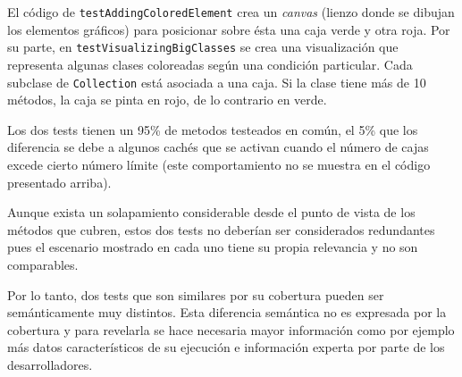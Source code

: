 \par El código de {\tt testAddingColoredElement} crea un \emph{canvas} (lienzo donde se dibujan los elementos gráficos) para posicionar sobre ésta una caja verde y otra roja. Por su parte, en {\tt testVisualizingBigClasses} se crea una visualización que representa algunas clases coloreadas según una condición particular. Cada subclase de {\tt Collection} está asociada a una caja. Si la clase tiene más de 10 métodos, la caja se pinta en rojo, de lo contrario en verde. 

\par Los dos tests tienen un 95\% de metodos testeados en común, el 5\% que los diferencia se debe a algunos cachés que se activan cuando el número de cajas excede cierto número límite (este comportamiento no se muestra en el código presentado arriba). 

\par Aunque exista un solapamiento considerable desde el punto de vista de los métodos que cubren, estos dos tests no deberían ser considerados redundantes pues el escenario mostrado en cada uno tiene su propia relevancia y no son comparables. 

\par Por lo tanto, dos tests que son similares por su cobertura pueden ser semánticamente muy distintos. Esta diferencia semántica no es expresada por la cobertura y para revelarla se hace necesaria mayor información como por ejemplo más datos característicos de su ejecución e información experta por parte de los desarrolladores. 
